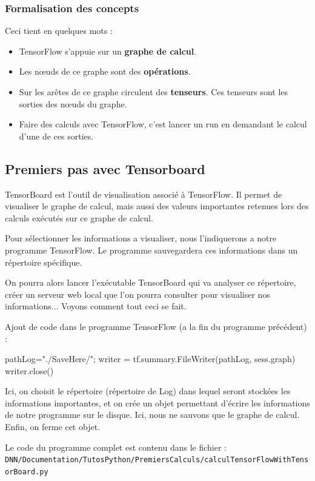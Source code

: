 \documentclass[a4paper,11pt]{book}
\begin{document}
\subsubsection{Formalisation des concepts}
Ceci tient en quelques mots :
\begin{itemize}
\item TensorFlow s'appuie sur un \textbf{graphe de calcul}.
\item Les nœuds de ce graphe sont des \textbf{opérations}.
\item Sur les arêtes de ce graphe circulent des \textbf{tenseurs}. Ces tenseurs sont les sorties des nœuds du graphe.
\item Faire des calculs avec TensorFlow, c'est lancer un run en demandant le calcul d'une de ces sorties.
\end{itemize}

\subsection{Premiers pas avec Tensorboard}

TensorBoard est l'outil de visualisation associé à TensorFlow. Il permet de visualiser le graphe de calcul, mais aussi des valeurs importantes retenues lors des calculs exécutés sur ce graphe de calcul.

Pour sélectionner les informations a visualiser, nous l'indiquerons a notre programme TensorFlow. Le programme sauvegardera ces informations dans un répertoire spécifique.

On pourra alors lancer l'exécutable TensorBoard qui va analyser ce répertoire, créer un serveur web local que l'on pourra consulter pour visualiser nos informations...
Voyons comment tout ceci se fait.


Ajout de code dans le programme TensorFlow (a la fin du programme précédent) :
\begin{mypython}
pathLog="./SaveHere/";
writer = tf.summary.FileWriter(pathLog, sess.graph)
writer.close()
\end{mypython}
Ici, on choisit le répertoire (répertoire de Log) dans lequel seront stockées les informations importantes, et on crée un objet permettant d'écrire les informations de notre programme sur le disque. Ici, nous ne sauvons que le graphe de calcul. Enfin, on ferme cet objet.

Le code du programme complet est contenu dans le fichier :\\
\verb+DNN/Documentation/TutosPython/PremiersCalculs/calculTensorFlowWithTensorBoard.py+
\end{document}
